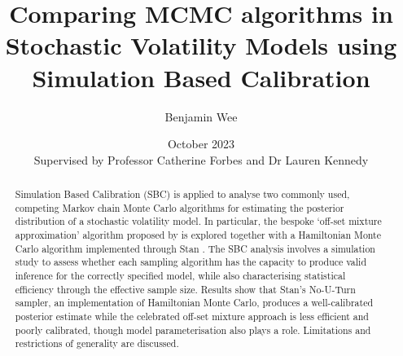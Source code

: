\documentclass[12pt, a4paper]{article}
\title{Comparing MCMC algorithms in Stochastic Volatility Models using Simulation Based Calibration}
\author{Benjamin Wee}
\date{\small October 2023\\[0.5cm]{\small Supervised by Professor Catherine Forbes and Dr Lauren Kennedy}}
\begin{document}
\maketitle 

\begin{abstract}
    Simulation Based Calibration (SBC) \citep{talts2020validating} is applied to analyse two commonly used, competing Markov chain Monte Carlo algorithms for estimating the posterior distribution of a stochastic volatility model. In particular, the bespoke ‘off-set mixture approximation’ algorithm proposed by \citet{kim1998stochastic} is explored together with a Hamiltonian Monte Carlo algorithm implemented through Stan \citep{stan}. The SBC analysis involves a simulation study to assess whether each sampling algorithm has the capacity to produce valid inference for the correctly specified model, while also characterising statistical efficiency through the effective sample size. Results show that Stan's No-U-Turn sampler, an implementation of Hamiltonian Monte Carlo, produces a well-calibrated posterior estimate while the celebrated off-set mixture approach is less efficient and poorly calibrated, though model parameterisation also plays a role. Limitations and restrictions of generality are discussed.
    
    

\end{abstract}
\end{document}
